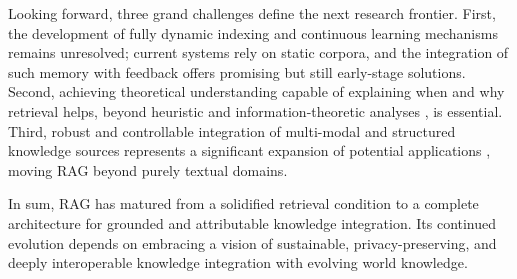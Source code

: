 \documentclass[11pt,a4paper]{article}
\begin{document}
Looking forward, three grand challenges define the next research frontier. First, the development of fully dynamic indexing and continuous learning mechanisms remains unresolved; current systems rely on static corpora, and the integration of such memory with feedback \cite{arxiv:2603.01783v1} offers promising but still early-stage solutions. Second, achieving theoretical understanding capable of explaining when and why retrieval helps, beyond heuristic and information-theoretic analyses \cite{arxiv:2312.08976v2,arxiv:2301.12652v4}, is essential. Third, robust and controllable integration of multi-modal and structured knowledge sources represents a significant expansion of potential applications \cite{arxiv:2504.08748v1,arxiv:2603.05698v2}, moving RAG beyond purely textual domains.

In sum, RAG has matured from a solidified retrieval condition to a complete architecture for grounded and attributable knowledge integration. Its continued evolution depends on embracing a vision of sustainable, privacy-preserving, and deeply interoperable knowledge integration with evolving world knowledge.
\end{document}
